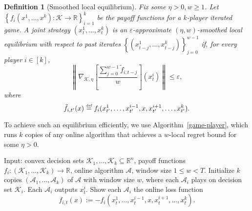 \documentclass{article}
\def\reals{{\mathbb R}}
\newcommand{\equaldef}{\stackrel{\text{\tiny def}}{=}}
\def\reals{{\mathbb R}}
\newcommand{\K}{\ensuremath{\mathcal K}}
\def\eps{\varepsilon}
\newcommand{\braces}[1]{\left\{#1\right\}}
\newcommand{\bra}[1]{\left[#1\right]}
\newcommand{\R}{\mathbb{R}}
\newtheorem{definition}[theorem]{Definition}
\renewcommand{\K}{\mathcal{K}}
\newcommand{\Acal}{\mathcal{A}}
\begin{document}
\begin{definition}[Smoothed local equilibrium]
Fix some $\eta > 0, w \geq 1$. Let $\braces{ f_i(x^1, \ldots, x^k) : \K \rightarrow \R }_{i=1}^k$ be the payoff functions for a $k$-player iterated game. A joint strategy $(x_t^1, \ldots, x_t^k)$ is an $\eps$-approximate $(\eta, w)$-\emph{smoothed local equilibrium} with respect to past iterates $\braces{ (x_{t-j}^1, \ldots, x_{t-j}^k) }_{j=0}^{w-1}$ if, for every player $i \in [k]$,
\begin{equation*}
\left\lVert \nabla_{\K, \eta} \bra{\frac{ \sum_{j=0}^{w-1} \tilde f_{i,t-j} }{w} }(x_t^i) \right\rVert \leq \eps,
\end{equation*}
where
\begin{equation*}
\tilde f_{i,t'}(x) \equaldef f_i(x_{t'}^1, \ldots, x_{t'}^{i-1}, x, x_{t'}^{i+1}, \ldots, x_{t'}^k).
\end{equation*}
\end{definition}

To achieve such an equilibrium efficiently, we use Algorithm~\ref{game-player}, which runs $k$ copies of any online algorithm that achieves a $w$-local regret bound for some $\eta > 0$.
\begin{algorithm}
\caption{Time-smoothed game simulation}
\label{game-player}
\begin{algorithmic}[1]
\STATE Input: convex decision sets $\K_1, \ldots, \K_k \subseteq \reals^n$, payoff functions $f_i : (\K_1, \ldots, \K_k) \rightarrow \R$, online algorithm $\Acal$, window size $1 \leq w < T$.
\STATE Initialize $k$ copies $(\Acal_1, \ldots, \Acal_k)$ of $\Acal$ with window size $w$, where each $\Acal_i$ plays on decision set $\K_i$.
\STATE Each $\Acal_i$ outputs $x_t^i$.
\STATE Show each $\Acal_i$ the online loss function
\[f_{i,t}(x) := -f_i(x^1_t, \ldots, x^{i-1}_t, x, x^{i+1}_{t}, \ldots, x^k_t).\]
\ENDFOR
\end{algorithmic}
\end{algorithm}
\end{document}

